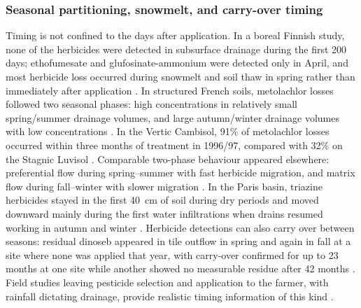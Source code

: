 \documentclass[11pt]{article}
\begin{document}
\subsubsection{Seasonal partitioning, snowmelt, and carry-over timing}
Timing is not confined to the days after application. In a boreal Finnish study, none of the herbicides were detected in subsurface drainage during the first 200 days; ethofumesate and glufosinate-ammonium were detected only in April, and most herbicide loss occurred during snowmelt and soil thaw in spring rather than immediately after application \parencite{Siimes2006}. In structured French soils, metolachlor losses followed two seasonal phases: high concentrations in relatively small spring/summer drainage volumes, and large autumn/winter drainage volumes with low concentrations \parencite{Novak2001}. In the Vertic Cambisol, 91\% of metolachlor losses occurred within three months of treatment in 1996/97, compared with 32\% on the Stagnic Luvisol \parencite{Novak2001}. Comparable two-phase behaviour appeared elsewhere: preferential flow during spring--summer with fast herbicide migration, and matrix flow during fall--winter with slower migration \parencite{Dousset2004}. In the Paris basin, triazine herbicides stayed in the first 40~cm of soil during dry periods and moved downward mainly during the first water infiltrations when drains resumed working in autumn and winter \parencite{Garmouma1998}. Herbicide detections can also carry over between seasons: residual dinoseb appeared in tile outflow in spring and again in fall at a site where none was applied that year, with carry-over confirmed for up to 23 months at one site while another showed no measurable residue after 42 months \parencite{ONEILL1989}. Field studies leaving pesticide selection and application to the farmer, with rainfall dictating drainage, provide realistic timing information of this kind \parencite{ONEILL1989}.
\end{document}
